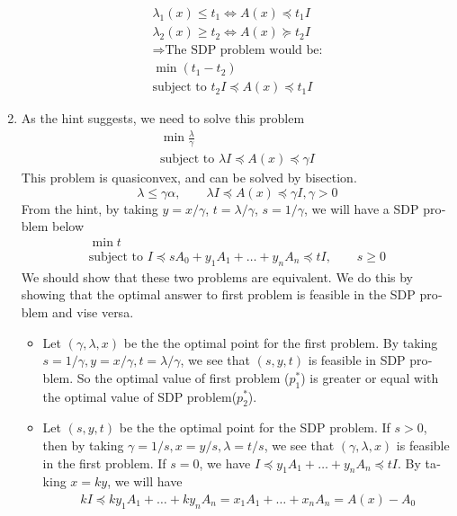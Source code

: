 \begin{latin}
\begin{enumerate}
	\begin{gather*}
		\lambda_1(x) \leq t_{1}  \Leftrightarrow A(x) \preceq t_{1}I
		\\
		\lambda_2(x) \geq t_{2}  \Leftrightarrow A(x) \succeq t_{2}I
		\\
		\Rightarrow \text{The SDP problem would be:}
		\\
		\min (t_{1} - t_{2})
		\\
		\text{subject to } t_{2}I \preceq A(x) \preceq t_{1}I
	\end{gather*}
	\item As the hint suggests, we need to solve this problem
	\begin{gather*}
		\min \frac{\lambda}{\gamma} 
		\\
		\text{subject to } \lambda I \preceq A(x) \preceq \gamma I
	\end{gather*}
	This problem is quasiconvex, and can be solved by bisection. 
	\begin{equation*}
		\lambda \leq \gamma \alpha, \qquad \lambda I \preceq A(x) \preceq \gamma I, \gamma > 0
	\end{equation*}
	From the hint, by taking $ y = x/\gamma $, $ t = \lambda/\gamma $, $ s = 1/\gamma $, we will have a SDP problem below
	\begin{gather*}
		\min t
		\\
		\text{subject to } I \preceq sA_{0} + y_{1}A_{1} + \dots + y_{n}A_{n} \preceq tI, \qquad s \geq 0
	\end{gather*}
	We should show that these two problems are equivalent. We do this by showing that the optimal answer to first problem is feasible in the SDP problem and vise versa.
	\begin{itemize}
		\item 
			 Let $ (\gamma, \lambda, x) $ be the the optimal point for the first problem. By taking $ s = 1/\gamma, y = x/\gamma, t = \lambda/\gamma $, we see that $ (s,y,t) $ is feasible in SDP problem. So the optimal value of first problem ($ p_{1}^{*} $) is greater or equal with the optimal value of SDP problem($ p_{2}^{*} $). 
	 	\item 
	 		Let $ (s,y,t) $ be the the optimal point for the SDP problem.  If $ s > 0 $, then by taking $ \gamma = 1/s, x = y/s, \lambda = t/s $, we see that $ (\gamma, \lambda, x) $ is feasible in the first problem. If $ s = 0 $, we have $  I \preceq y_{1}A_{1} + \dots + y_{n}A_{n} \preceq tI $.
	 		By taking $ x = ky $, we will have 
	 		\begin{gather*}
	 			kI \preceq ky_{1}A_{1} + \dots + ky_{n}A_{n} = x_{1}A_{1} + \dots + x_{n}A_{n} = A(x) - A_{0}

\end{gather*}
\end{itemize}
\end{enumerate}
\end{latin}
